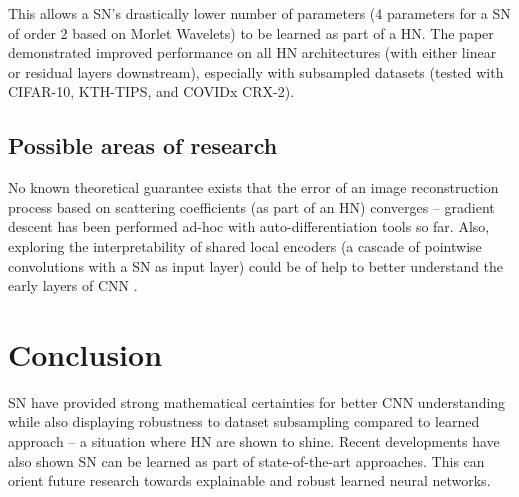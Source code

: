 \documentclass[runningheads]{llncs}
\begin{document}
This allows a SN's drastically lower number of parameters (4 parameters for a SN of order 2 based on Morlet Wavelets) to be learned as part of a HN. The paper demonstrated improved performance on all HN architectures (with either linear or residual layers downstream), especially with subsampled datasets (tested with CIFAR-10, KTH-TIPS, and COVIDx CRX-2\cite{covid}).

\subsection{Possible areas of research}

No known theoretical guarantee exists that the error of an image reconstruction process based on scattering coefficients (as part of an HN) converges \cite{oyallon} -- gradient descent has been performed ad-hoc with auto-differentiation tools so far. Also, exploring the interpretability of shared local encoders (a cascade of pointwise convolutions with a SN as input layer) could be of help to better understand the early layers of CNN \cite{oyallon}.

\section{Conclusion}

SN have provided strong mathematical certainties for better CNN understanding while also displaying robustness to dataset subsampling compared to learned approach -- a situation where HN are shown to shine. Recent developments have also shown SN can be learned as part of state-of-the-art approaches. This can orient future research towards explainable and robust learned neural networks.
\end{document}
